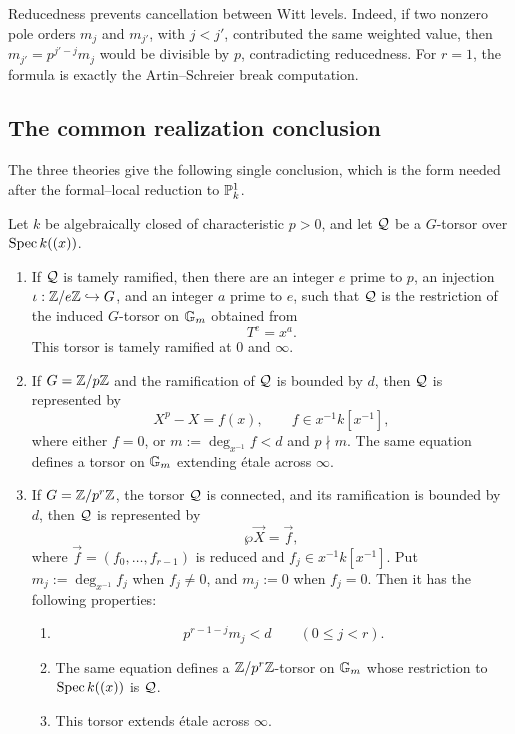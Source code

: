 Reducedness prevents cancellation between Witt levels. Indeed, if two
nonzero pole orders $m_j$ and $m_{j'}$, with $j<j'$, contributed the same
weighted value, then
$m_{j'}=p^{j'-j}m_j$ would be divisible by $p$, contradicting reducedness.
For $r=1$, the formula is exactly the Artin--Schreier break computation.

\subsection{The common realization conclusion}

The three theories give the following single conclusion, which is the form
needed after the formal--local reduction to $\mathbb{P}^1_k$.

\begin{lemma}
\label{lemma:realization_over_Gm}
\label{lemma:realization_over_Gm_Wr}
Let $k$ be algebraically closed of characteristic $p>0$, and let $\mathcal{Q}$ be a
$G$-torsor over $\operatorname{Spec} k((x))$.
\begin{enumerate}
    \item If $\mathcal{Q}$ is tamely ramified, then there are an integer $e$ prime
    to $p$, an injection $\iota:\mathbb{Z}/e\mathbb{Z}\hookrightarrow G$, and an integer
    $a$ prime to $e$, such that $\mathcal{Q}$ is the restriction of the induced
    $G$-torsor on $\mathbb{G}_m$ obtained from
    \[
    T^e=x^a.
    \]
    This torsor is tamely ramified at $0$ and $\infty$.

    \item If $G=\mathbb{Z}/p\mathbb{Z}$ and the ramification of $\mathcal{Q}$ is bounded by $d$,
    then $\mathcal{Q}$ is represented by
    \[
    X^p-X=f(x),\qquad f\in x^{-1}k[x^{-1}],
    \]
    where either $f=0$, or
    $m:=\deg_{x^{-1}}f<d$ and $p\nmid m$. The same equation defines a
    torsor on $\mathbb{G}_m$ extending \'etale across $\infty$.

    \item If $G=\mathbb{Z}/p^r\mathbb{Z}$, the torsor $\mathcal{Q}$ is connected, and its
    ramification is bounded by $d$, then $\mathcal{Q}$ is represented by
    \[
    \wp\vec X=\vec f,
    \]
    where $\vec f=(f_0,\dots,f_{r-1})$ is reduced and
    $f_j\in x^{-1}k[x^{-1}]$. Put
    $m_j:=\deg_{x^{-1}}f_j$ when $f_j\neq0$, and $m_j:=0$ when $f_j=0$.
    Then it has the following properties:
    \begin{enumerate}
        \item \label{item:realization_Wr_polebound}
        \begin{equation}\label{eq:parallel_witt_pole_bound}
        p^{r-1-j}m_j<d\qquad(0\leq j<r).
        \end{equation}
        \item \label{item:realization_Wr_torsor}
        The same equation defines a $\mathbb{Z}/p^r\mathbb{Z}$-torsor on $\mathbb{G}_m$ whose
        restriction to $\operatorname{Spec} k((x))$ is $\mathcal{Q}$.
        \item \label{item:realization_Wr_infty}
        This torsor extends \'etale across $\infty$.
    \end{enumerate}
\end{enumerate}
\end{lemma}

